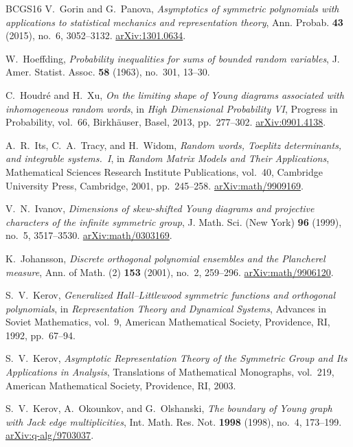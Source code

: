 \documentclass[11pt,reqno]{amsart}
\theoremstyle{definition}
\theoremstyle{remark}
\numberwithin{equation}{section}
\begin{document}
\begin{thebibliography}{BCGS16}
V.~Gorin and G.~Panova,
\emph{Asymptotics of symmetric polynomials with applications to statistical
mechanics and representation theory},
Ann. Probab. \textbf{43} (2015), no.~6, 3052--3132.
\href{https://arxiv.org/abs/1301.0634}{arXiv:1301.0634}.

W.~Hoeffding,
\emph{Probability inequalities for sums of bounded random variables},
J. Amer. Statist. Assoc. \textbf{58} (1963), no.~301, 13--30.

C.~Houdr\'e and H.~Xu,
\emph{On the limiting shape of Young diagrams associated with inhomogeneous
random words},
in \emph{High Dimensional Probability VI},
Progress in Probability, vol.~66, Birkh\"auser, Basel, 2013, pp.~277--302.
\href{https://arxiv.org/abs/0901.4138}{arXiv:0901.4138}.

A.~R.~Its, C.~A.~Tracy, and H.~Widom,
\emph{Random words, Toeplitz determinants, and integrable systems.~I},
in \emph{Random Matrix Models and Their Applications},
Mathematical Sciences Research Institute Publications, vol.~40,
Cambridge University Press, Cambridge, 2001, pp.~245--258.
\href{https://arxiv.org/abs/math/9909169}{arXiv:math/9909169}.

V.~N.~Ivanov,
\emph{Dimensions of skew-shifted Young diagrams and projective characters of
the infinite symmetric group},
J. Math. Sci. (New York) \textbf{96} (1999), no.~5, 3517--3530.
\href{https://arxiv.org/abs/math/0303169}{arXiv:math/0303169}.

K.~Johansson,
\emph{Discrete orthogonal polynomial ensembles and the Plancherel measure},
Ann. of Math. (2) \textbf{153} (2001), no.~2, 259--296.
\href{https://arxiv.org/abs/math/9906120}{arXiv:math/9906120}.

S.~V.~Kerov,
\emph{Generalized Hall--Littlewood symmetric functions and orthogonal
polynomials},
in \emph{Representation Theory and Dynamical Systems},
Advances in Soviet Mathematics, vol.~9,
American Mathematical Society, Providence, RI, 1992, pp.~67--94.

S.~V.~Kerov,
\emph{Asymptotic Representation Theory of the Symmetric Group and Its
Applications in Analysis},
Translations of Mathematical Monographs, vol.~219,
American Mathematical Society, Providence, RI, 2003.

S.~V.~Kerov, A.~Okounkov, and G.~Olshanski,
\emph{The boundary of Young graph with Jack edge multiplicities},
Int. Math. Res. Not. \textbf{1998} (1998), no.~4, 173--199.
\href{https://arxiv.org/abs/q-alg/9703037}{arXiv:q-alg/9703037}.


\end{thebibliography}
\end{document}
